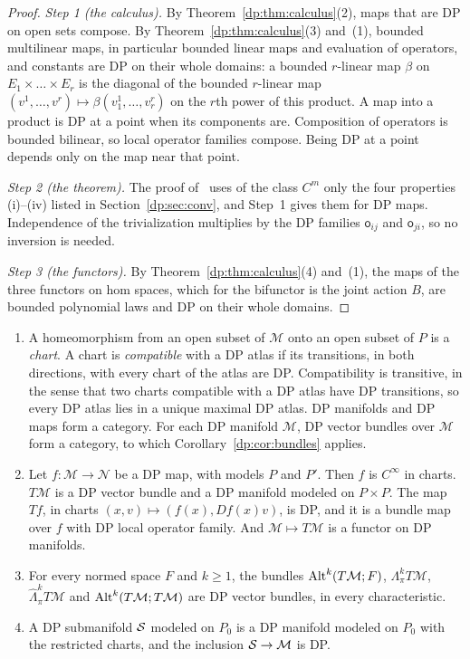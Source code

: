 \begin{proof}
\emph{Step 1 (the calculus).} By Theorem~\ref{dp:thm:calculus}(2), maps that are DP on open sets compose. By Theorem~\ref{dp:thm:calculus}(3) and~(1), bounded multilinear maps, in particular bounded linear maps and evaluation of operators, and constants are DP on their whole domains: a bounded $r$\nobreakdash-linear map $\beta$ on $E_1\times\dots\times E_r$ is the diagonal of the bounded $r$\nobreakdash-linear map $(v^1,\dots,v^r)\mapsto\beta(v^1_1,\dots,v^r_r)$ on the $r$th power of this product. A map into a product is DP at a point when its components are. Composition of operators is bounded bilinear, so local operator families compose. Being DP at a point depends only on the map near that point.

\emph{Step 2 (the theorem).} The proof of~\cite[Theorem~2.1]{I} uses of the class $C^m$ only the four properties (i)--(iv) listed in Section~\ref{dp:sec:conv}, and Step~1 gives them for DP maps. Independence of the trivialization multiplies by the DP families $\mathsf o_{ij}$ and $\mathsf o_{ji}$, so no inversion is needed.

\emph{Step 3 (the functors).} By Theorem~\ref{dp:thm:calculus}(4) and~(1), the maps of the three functors on hom spaces, which for the bifunctor is the joint action $B$, are bounded polynomial laws and DP on their whole domains.
\end{proof}

\begin{proposition}[categories]\label{dp:prop:categories}
\leavevmode
\begin{enumerate}
\item A homeomorphism from an open subset of $\mathcal M$ onto an open subset of $P$ is a \emph{chart}. A chart is \emph{compatible} with a DP atlas if its transitions, in both directions, with every chart of the atlas are DP. Compatibility is transitive, in the sense that two charts compatible with a DP atlas have DP transitions, so every DP atlas lies in a unique maximal DP atlas. DP manifolds and DP maps form a category. For each DP manifold $\mathcal M$, DP vector bundles over $\mathcal M$ form a category, to which Corollary~\ref{dp:cor:bundles} applies.
\item Let $f\colon\mathcal M\to\mathcal N$ be a DP map, with models $P$ and $P'$. Then $f$ is $C^\infty$ in charts. $T\mathcal M$ is a DP vector bundle and a DP manifold modeled on $P\times P$. The map $Tf$, in charts $(x,v)\mapsto(f(x),Df(x)v)$, is DP, and it is a bundle map over $f$ with DP local operator family. And $\mathcal M\mapsto T\mathcal M$ is a functor on DP manifolds.
\item For every normed space $F$ and $k\ge1$, the bundles $\operatorname{Alt}^k(T\mathcal M;F)$, $\Lambda^k_\pi T\mathcal M$, $\widehat\Lambda^k_\pi T\mathcal M$ and $\operatorname{Alt}^k(T\mathcal M;T\mathcal M)$ are DP vector bundles, in every characteristic.
\item A DP submanifold $\mathcal S$ modeled on $P_0$ is a DP manifold modeled on $P_0$ with the restricted charts, and the inclusion $\mathcal S\to\mathcal M$ is DP.
\end{enumerate}
\end{proposition}

